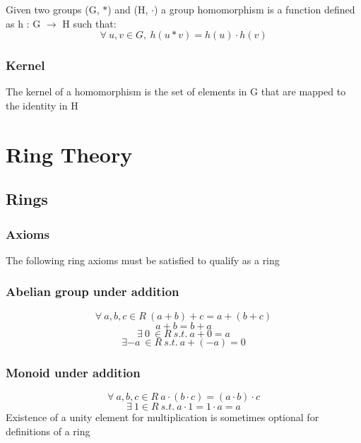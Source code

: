 \documentclass[10pt,a4paper]{report}
\begin{document}
Given two groups (G, $\ast$) and (H, $\cdot$) a group homomorphism is a function defined as h : G $\rightarrow$ H such that:
\begin{equation}
	\forall\ u,v \in G,\ h (u \ast v) = h (u) \cdot h(v)
\end{equation}
\subsection*{Kernel}
The kernel of a homomorphism is the set of elements in G that are mapped to the identity in H

\chapter{Ring Theory}
\section{Rings}

\subsection{Axioms}

The following ring axioms must be satisfied to qualify as a ring

\subsection*{Abelian group under addition}
\begin{equation}
	\forall\ a,b,c \in R\ (a + b) + c = a + (b + c)
\end{equation}
\begin{equation}
	a + b = b + a 
\end{equation}
\begin{equation}
	\exists\ 0\ \in R\ s.t.\ a + 0 = a
\end{equation}
\begin{equation}
	\exists -a\ \in R\ s.t.\ a + (-a) = 0
\end{equation}
\subsection*{Monoid under addition}
\begin{equation}
	\forall\ a,b,c \in R\ a \cdot (b \cdot c) = (a \cdot b) \cdot c
\end{equation}
\begin{equation}
	\exists\ 1 \in R\ s.t.\ a \cdot 1 = 1 \cdot a = a
\end{equation}
Existence of a unity element for multiplication is sometimes optional for definitions of a ring
\end{document}
